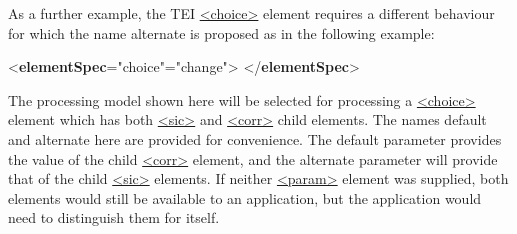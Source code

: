 As a further example, the TEI \hyperref[TEI.choice]{<choice>} element requires a different behaviour for which the name \textsf{alternate} is proposed as in the following example: \par\bgroup{}\exampleFont \begin{shaded}\noindent\mbox{}{<\textbf{elementSpec}\hspace*{1em}{ident}="{choice}"\hspace*{1em}{mode}="{change}">}\mbox{}\newline 
{}\mbox{}\newline 
\hspace*{1em}\mbox{}\newline 
\hspace*{1em}\mbox{}\newline 
{}\mbox{}\newline 
{</\textbf{elementSpec}>}\end{shaded}\egroup\par \noindent  The processing model shown here will be selected for processing a \hyperref[TEI.choice]{<choice>} element which has both \hyperref[TEI.sic]{<sic>} and \hyperref[TEI.corr]{<corr>} child elements. The names \textsf{default} and \textsf{alternate} here are provided for convenience. The \textsf{default} parameter provides the value of the child \hyperref[TEI.corr]{<corr>} element, and the \textsf{alternate} parameter will provide that of the child \hyperref[TEI.sic]{<sic>} elements. If neither \hyperref[TEI.param]{<param>} element was supplied, both elements would still be available to an application, but the application would need to distinguish them for itself.\par
